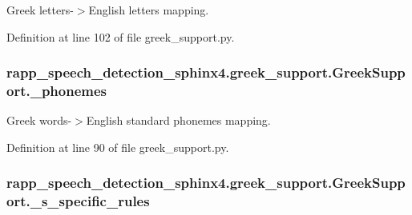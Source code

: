 Greek letters-\/$>$English letters mapping. 



Definition at line 102 of file greek\-\_\-support.\-py.

\hypertarget{classrapp__speech__detection__sphinx4_1_1greek__support_1_1GreekSupport_ac660aeb52c669c9e0bd81d9cac50c3d6}{
\subsubsection[{\-\_\-phonemes}]{\setlength{\rightskip}{0pt plus 5cm}rapp\-\_\-speech\-\_\-detection\-\_\-sphinx4.\-greek\-\_\-support.\-Greek\-Support.\-\_\-phonemes\hspace{0.3cm}{\ttfamily [private]}}}\label{classrapp__speech__detection__sphinx4_1_1greek__support_1_1GreekSupport_ac660aeb52c669c9e0bd81d9cac50c3d6}


Greek words-\/$>$English standard phonemes mapping. 



Definition at line 90 of file greek\-\_\-support.\-py.

\hypertarget{classrapp__speech__detection__sphinx4_1_1greek__support_1_1GreekSupport_acdc908eced1c5243b5f8cb75dae0cd8b}{
\subsubsection[{\-\_\-s\-\_\-specific\-\_\-rules}]{\setlength{\rightskip}{0pt plus 5cm}rapp\-\_\-speech\-\_\-detection\-\_\-sphinx4.\-greek\-\_\-support.\-Greek\-Support.\-\_\-s\-\_\-specific\-\_\-rules\hspace{0.3cm}{\ttfamily [private]}}}\label{classrapp__speech__detection__sphinx4_1_1greek__support_1_1GreekSupport_acdc908eced1c5243b5f8cb75dae0cd8b}


